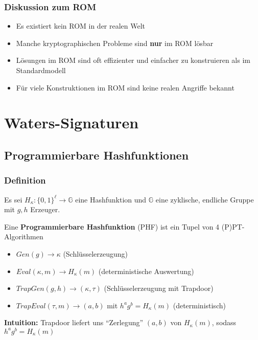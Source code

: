 \documentclass[12pt,A4]{extarticle}
\newcommand{\highlight}[1]{\textcolor{highlightColor}{\textbf{#1}}}
\begin{document}
\subsubsection{Diskussion zum ROM}
\begin{itemize}
  \item{Es existiert kein ROM in der realen Welt}
  \item{Manche kryptographischen Probleme sind \textbf{nur} im ROM lösbar}
  \item{Lösungen im ROM sind oft effizienter und einfacher zu konstruieren als im Standardmodell}
  \item{Für viele Konstruktionen im ROM sind keine realen Angriffe bekannt}
\end{itemize}

\section{Waters-Signaturen}
\subsection{Programmierbare Hashfunktionen}
\subsubsection{Definition}
Es sei $H_\kappa: {\{0,1\}}^\ell \rightarrow \mathbb{G}$ eine Hashfunktion und $\mathbb{G}$ eine zyklische, endliche Gruppe mit $g, h$ Erzeuger.\par
Eine \highlight{Programmierbare Hashfunktion} (PHF) ist ein Tupel von 4 (P)PT-Algorithmen
\begin{itemize}
  \item{$Gen(g) \rightarrow \kappa$ \hspace{1cm} (Schlüsselerzeugung)}
  \item{$Eval(\kappa, m) \rightarrow H_\kappa(m)$ \hspace{1cm} (deterministische Auswertung)}
  \item{$TrapGen(g,h) \rightarrow (\kappa, \tau)$ \hspace{1cm} (Schlüsselerzeugung mit Trapdoor)}
  \item{$TrapEval(\tau, m) \rightarrow (a,b)$ mit $h^a g^b = H_\kappa(m)$ \hspace{1cm} (deterministisch)}
\end{itemize}
\textbf{Intuition:} Trapdoor liefert uns ``Zerlegung'' $(a,b)$ von $H_\kappa(m)$, sodass $h^a g^b = H_\kappa(m)$
\end{document}
